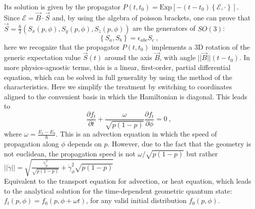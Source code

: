 \documentclass[%
 reprint,
 superscriptaddress,
 aps,
 pra,
]{revtex4-2}
\theoremstyle{definition}
\begin{document}
Its solution is given by the propagator $P(t,t_0) = \mathrm{Exp}\left[ - (t-t_0)\left\{\mathcal{E}, \cdot \right\} \right]$.
Since $\mathcal{E}= \vec{B} \cdot \vec{S}$ and, by using the algebra of poisson brackets,
one can prove that $\vec{S} = \frac{\hbar}{2}\left( S_x(p,\phi),S_y(p,\phi),S_z(p,\phi)\right)$ are the generators of $SO(3)$:
\begin{equation}
\left\{ S_a, S_b\right\} = \epsilon_{abc} S_c~,
\end{equation}
 here we recognize that the propagator $P(t,t_0)$ implements a 3D rotation of the generic 
expectation value $\vec{S}(t)$ around the axis $\vec{B}$, with angle $||\vec{B}||(t - t_0)$. 
In more physics-agnostic terms, this is a linear, first-order, partial differential equation, which can be solved 
in full generality by using the method of the characteristics. Here we simplify the treatment 
by switching to coordinates aligned to the convenient basis in which the Hamiltonian 
is diagonal. This leads to
\begin{equation}
\frac{\partial f_t}{\partial t} + \frac{\omega}{\sqrt{p(1-p)}} \frac{\partial f_t}{\partial \phi} = 0~,
\end{equation}
where $\omega = \frac{E_1 - E_0}{\hbar}$. This is an advection equation in which the speed of 
propagation along $\phi$ depends on $p$. However, due to the fact that the geometry is not euclidean, 
the propagation speed is not $\omega/\sqrt{p(1-p)}$ but rather $||\dot{\gamma}|| = \sqrt{\frac{\dot{\gamma}_p^2}{\sqrt{p(1-p)}}+\dot{\gamma}_{\phi}^2 \sqrt{p(1-p)}}$\\

Equivalent to the transport 
equation for advection, or heat equation, which leads to the analytical solution for the 
time-dependent geometric quantum state: $f_t(p,\phi) = f_0(p,\phi+\omega t)$, for any 
valid initial distribution $f_0(p,\phi)$.
\end{document}
